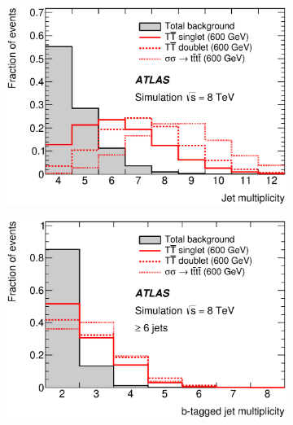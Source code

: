 \begin{figure}[!tb]
\centering
\begin{subfigure}{0.49\textwidth}{\includegraphics[width=\textwidth]{Analysis/Figures_HtX/HtXPaper/HtX/jet_n4jetin2btagin_shapes.eps}}\caption{}\label{fig:shape_njet}
    \end{subfigure}
\begin{subfigure}{0.49\textwidth}{\includegraphics[width=\textwidth]{Analysis/Figures_HtX/HtXPaper/HtX/bjet_n6jetin2btagin_shapes.eps}}\caption{}\label{fig:shape_nbtag}
    \end{subfigure}

\end{figure}
